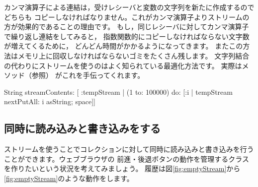 \documentclass[a4paper,10pt,twoside]{book}
\begin{document}
カンマ演算子による連結は，受けレシーバと変数の文字列を新たに作成するのでどちらも
コピーしなければなりません。これがカンマ演算子よりストリームの方が効果的であることの理由です。
もし，同じレシーバに対してカンマ演算子で繰り返し連結をしてみると，
指数関数的にコピーしなければならない文字数が増えてくるために，
どんどん時間がかかるようになってきます。
またこの方法はメモリ上に回収しなければならないゴミをたくさん残します。
文字列結合の代わりにストリームを使うのはよく知られている最適化方法です。
実際はメソッド（\pageref{sec:streamContents}参照）
がこれを手伝ってくれます。


\begin{code}{}
String streamContents: [ :tempStream |
  (1 to: 100000)
       do: [:i | tempStream nextPutAll: i asString; space]] 
\end{code}

\subsection{同時に読み込みと書き込みをする}

ストリームを使うことでコレクションに対して同時に読み込みと書き込みを行うことができます。ウェブブラウザの
前進・後退ボタンの動作を管理するクラスを作りたいという状況を考えてみましょう。
履歴は図\ref{fig:emptyStream}から\ref{fig:emptyStream}のような動作をします。
\end{document}
